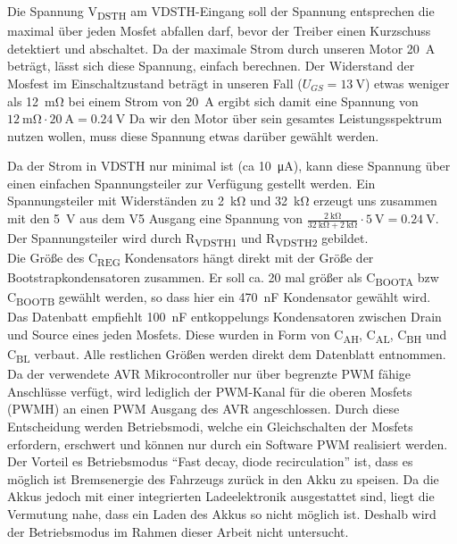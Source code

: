 Die Spannung V\textsubscript{DSTH} am VDSTH-Eingang soll der Spannung entsprechen die maximal über jeden Mosfet abfallen darf, bevor der Treiber einen Kurzschuss detektiert 
und abschaltet. Da der maximale Strom durch unseren Motor \SI{20}{\ampere} beträgt, lässt sich diese Spannung, einfach berechnen. Der Widerstand der Mosfest im Einschaltzustand beträgt
in unseren Fall ($U_{GS}=\SI{13}{\V}$) etwas weniger als \SI{12}{\milli\ohm}  bei einem Strom von \SI{20}{\A} ergibt sich damit eine Spannung von $\SI{12}{\milli\ohm} \cdot \SI{20}{\A} = \SI{0,24}{\V}$
Da wir den Motor über sein gesamtes Leistungsspektrum nutzen wollen, muss diese Spannung etwas darüber gewählt werden.

Da der Strom in VDSTH nur minimal ist (ca \SI{10}{\micro\ampere}), kann diese Spannung über einen einfachen Spannungsteiler zur Verfügung gestellt werden. Ein Spannungsteiler mit 
Widerständen zu \SI{2}{\kilo\ohm} und \SI{32}{\kilo\ohm} erzeugt uns zusammen mit den \SI{5}{\volt} aus dem V5 Ausgang eine Spannung von $\frac{\SI{2}{\kilo\ohm}}{\SI{32}{\kilo\ohm}+\SI{2}{\kilo\ohm}}\cdot \SI{5}{\V} =\SI{0,24}{\V}$.
Der Spannungsteiler wird durch R\textsubscript{VDSTH1} und R\textsubscript{VDSTH2} gebildet.\\

Die Größe des C\textsubscript{REG} Kondensators hängt direkt mit der Größe der Bootstrapkondensatoren zusammen. Er soll ca. 20 mal größer als
C\textsubscript{BOOTA} bzw C\textsubscript{BOOTB} gewählt werden, so dass hier ein \SI{470}{\nano\farad} Kondensator gewählt wird.\\

Das Datenbatt empfiehlt \SI{100}{\nano\farad} entkoppelungs Kondensatoren zwischen Drain und Source eines jeden Mosfets. Diese wurden in Form von C\textsubscript{AH}, C\textsubscript{AL}, C\textsubscript{BH} und C\textsubscript{BL} 
verbaut. Alle restlichen Größen werden direkt dem Datenblatt entnommen.\\

Da der verwendete AVR Mikrocontroller nur über begrenzte PWM fähige Anschlüsse verfügt, wird lediglich der PWM-Kanal für die oberen Mosfets (PWMH) an einen PWM Ausgang des AVR angeschlossen.
Durch diese Entscheidung werden Betriebsmodi, welche ein Gleichschalten der Mosfets erfordern, erschwert und können nur durch ein Software PWM realisiert werden. Der Vorteil es Betriebsmodus ``Fast decay, diode recirculation''
ist, dass es möglich ist Bremsenergie des Fahrzeugs zurück in den Akku zu speisen. Da die Akkus jedoch mit einer integrierten Ladeelektronik ausgestattet sind, liegt die Vermutung nahe, dass ein Laden des Akkus so nicht möglich ist.
Deshalb wird der Betriebsmodus im Rahmen dieser Arbeit nicht untersucht.

